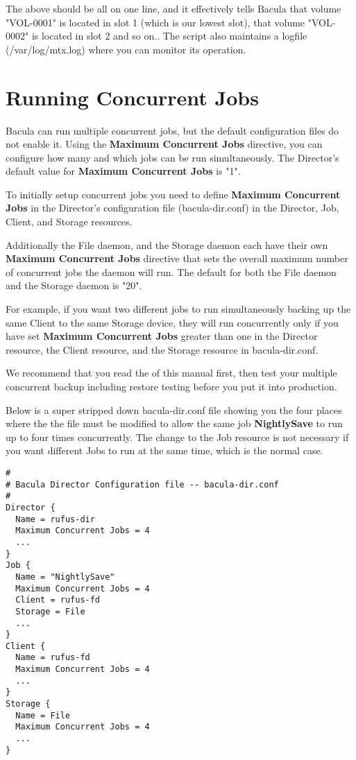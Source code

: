 The above should be all on one line, and it effectively tells Bacula that
volume "VOL-0001" is located in slot 1 (which is our lowest slot), that
volume "VOL-0002" is located in slot 2 and so on..
The script also maintains a logfile (/var/log/mtx.log) where you can monitor
its operation.

\section{Running Concurrent Jobs}
\label{ConcurrentJobs}

Bacula can run multiple concurrent jobs, but the default configuration files
do not enable it. Using the {\bf Maximum Concurrent Jobs} directive, you
can configure how many and which jobs can be run simultaneously.
The Director's default value for {\bf Maximum Concurrent Jobs} is "1".

To initially setup concurrent jobs you need to define {\bf Maximum Concurrent Jobs} in
the Director's configuration file (bacula-dir.conf) in the
Director, Job, Client, and Storage resources.

Additionally the File daemon, and the Storage daemon each have their own
{\bf Maximum Concurrent Jobs} directive that sets the overall maximum
number of concurrent jobs the daemon will run.  The default for both the
File daemon and the Storage daemon is "20".

For example, if you want two different jobs to run simultaneously backing up
the same Client to the same Storage device, they will run concurrently only if
you have set {\bf Maximum Concurrent Jobs} greater than one in the Director
resource, the Client resource, and the Storage resource in bacula-dir.conf.

We recommend that you read the  of this manual first, then test your multiple
concurrent backup including restore testing before you put it into
production.

Below is a super stripped down bacula-dir.conf file showing you the four
places where the the file must be modified to allow the same job {\bf
NightlySave} to run up to four times concurrently. The change to the Job
resource is not necessary if you want different Jobs to run at the same time,
which is the normal case.

\footnotesize
\begin{verbatim}
#
# Bacula Director Configuration file -- bacula-dir.conf
#
Director {
  Name = rufus-dir
  Maximum Concurrent Jobs = 4
  ...
}
Job {
  Name = "NightlySave"
  Maximum Concurrent Jobs = 4
  Client = rufus-fd
  Storage = File
  ...
}
Client {
  Name = rufus-fd
  Maximum Concurrent Jobs = 4
  ...
}
Storage {
  Name = File
  Maximum Concurrent Jobs = 4
  ...
}
\end{verbatim}
\normalsize
